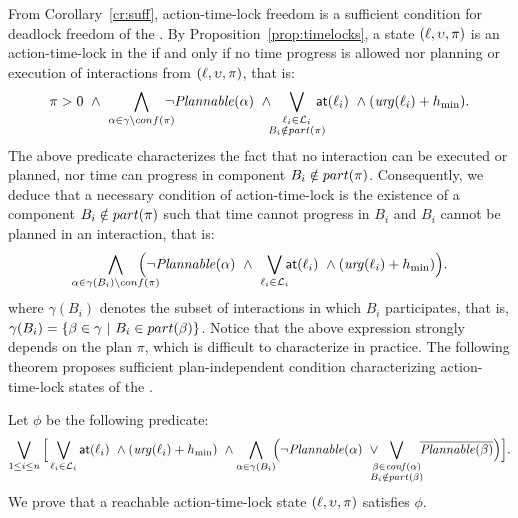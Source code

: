 From Corollary~\ref{cr:suff}, action-time-lock freedom is a sufficient 
condition for deadlock freedom of the \lpsabr.
By Proposition~\ref{prop:timelocks}, a state $(\ell,\upsilon,\pi)$ is an action-time-lock in the 
\lps if and only if no time progress is allowed nor planning or execution of interactions from 
$(\ell,\upsilon,\pi)$, that is:
\begin{displaymath}
  \pi>0 \ \wedge \ \bigwedge_{\alpha \in \gamma \setminus conf(\pi)} \hspace*{-2ex} \neg
  \plntxt{\alpha} \ \wedge
  \hspace*{-1ex} \bigvee_{\substack{\loc_i \in \Loc_i \\ B_i \notin \p{\pi}}} \hspace*{-2ex} 
  \al{\loc_i} \ \wedge(\urg(\loc_i) + \hmin).
\end{displaymath}
The above predicate characterizes the fact that no interaction can be executed or planned, 
nor time can progress in component $B_i \notin part(\pi)$.
Consequently, we deduce that a necessary condition of action-time-lock is the existence of a 
component $B_i \notin part(\pi)$ such that time cannot progress in $B_i$ and $B_i$ cannot be 
planned in an interaction, that is:
\begin{displaymath}
  \bigwedge_{\substack{\alpha \in \gamma(B_i) \setminus conf(\pi)}} \hspace*{-4ex} 
  \Big(\neg\plntxt{\alpha} \ \wedge \ \bigvee_{\loc_i \in \Loc_i} \hspace*{-1ex} \al{\loc_i} \ 
  \wedge(\urg(\loc_i) + \hmin)\Big).
\end{displaymath}
where $\gamma(B_i)$ denotes the subset of interactions in which $B_i$ participates, that is, 
$\gamma(B_i) = \{ \beta \in \gamma \ | \ B_i \in part(\beta) \}$.
Notice that the above expression strongly depends on the plan $\pi$, which is difficult to 
characterize in practice.
The following theorem proposes sufficient plan-independent condition characterizing 
action-time-lock states of the \lpsabrb.
\begin{theorem}\label{thm:dla}
  Let $\phi$ be the following predicate:
\begin{displaymath}
  \bigvee_{1\le i\le n}\Big[\bigvee_{\loc_i \in \Loc_i}\al{\loc_i}\ \wedge(\urg(\loc_i)+\hmin) \ 
  \wedge\bigwedge_{\alpha \in \gamma(B_i)}\hspace*{-1ex}\Big(  \neg\plntxt{\alpha} \
  \vee\hspace*{-2ex}\bigvee_{\substack{\beta\in\confl(\alpha)\\B_i\notin\p{\beta}}}\hspace*{-1ex}
  \overline{\plntxt{\beta}} \Big)\Big].
\end{displaymath}
We prove that a reachable action-time-lock state $(\ell,\upsilon,\pi)$ satisfies $\phi$.
\end{theorem}
